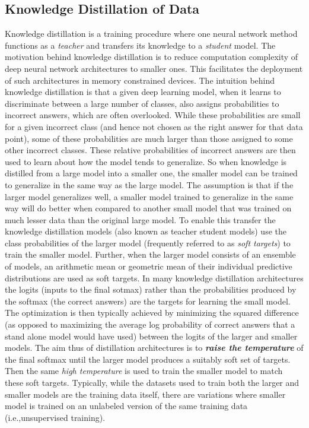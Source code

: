 \documentclass{article}
\begin{document}
\subsection{Knowledge Distillation of Data}
Knowledge distillation is a training procedure where one neural network method functions as a \textit{teacher} and transfers its knowledge to a \textit{student} model. The motivation behind knowledge distillation is to reduce computation complexity of deep neural network architectures to smaller ones. This facilitates the deployment of such architectures in memory constrained devices. The intuition behind knowledge distillation is that a given deep learning model, when it learns to discriminate between a large number of classes, also assigns probabilities to incorrect answers, which are often overlooked. While these probabilities are small for a given incorrect class (and hence not chosen as the right answer for that data point), some of these probabilities are much larger than those assigned to some other incorrect classes. These relative probabilities of incorrect answers are then used  to learn about how the model tends to generalize. So when knowledge is distilled from a large model into a smaller one, the smaller model can be trained to generalize in the same way as the large model. The assumption is that if the larger model generalizes well, a smaller model trained to generalize in the same way will do better when compared to another small model that was trained on much lesser data than the original large model. To enable this transfer the knowledge distillation models (also known as teacher student models) use the class probabilities of the larger model (frequently referred to as \textit{soft targets}) to train the smaller model. Further, when the larger model consists of an ensemble of models, an arithmetic mean or geometric mean of their individual predictive distributions are used as soft targets. In many knowledge distillation architectures the logits (inputs to the final sotmax) rather than the probabilities produced by the softmax (the correct answers) are the targets for learning the small model. The optimization is then typically achieved by minimizing the squared difference (as opposed to maximizing the average log probability of correct answers that a stand alone model would have used) between the logits of the larger and smaller models. The aim thus of distillation architectures is to \textbf{\textit{raise the temperature}} of the final softmax until the larger model produces a suitably soft set of targets. Then the same \textit{high temperature} is used to train the smaller model to match these soft targets. Typically, while the datasets used to train both the larger and smaller models are the training data itself, there are variations where smaller model is trained on an unlabeled version of the same training data (i.e.,unsupervised training).
\end{document}
